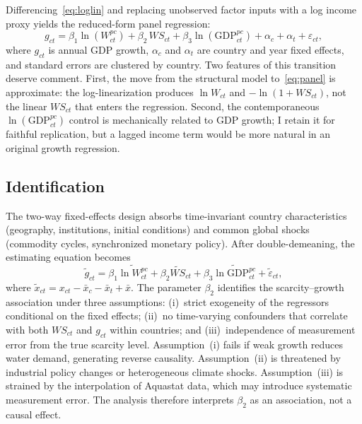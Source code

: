 \documentclass[12pt]{article}
\begin{document}
Differencing~\eqref{eq:loglin} and replacing unobserved factor inputs with a log income proxy yields the reduced-form panel regression:
\begin{equation}
g_{ct} = \beta_1 \ln(W^{pc}_{ct}) + \beta_2 \, WS_{ct} + \beta_3 \ln(\text{GDP}^{pc}_{ct}) + \alpha_c + \alpha_t + \varepsilon_{ct},
\label{eq:panel}
\end{equation}
where $g_{ct}$ is annual GDP growth, $\alpha_c$ and $\alpha_t$ are country and year fixed effects, and standard errors are clustered by country. Two features of this transition deserve comment. First, the move from the structural model to~\eqref{eq:panel} is approximate: the log-linearization produces $\ln W_{ct}$ and $-\ln(1+WS_{ct})$, not the linear $WS_{ct}$ that enters the regression. Second, the contemporaneous $\ln(\text{GDP}^{pc}_{ct})$ control is mechanically related to GDP growth; I retain it for faithful replication, but a lagged income term would be more natural in an original growth regression.

\subsection*{Identification}

The two-way fixed-effects design absorbs time-invariant country characteristics (geography, institutions, initial conditions) and common global shocks (commodity cycles, synchronized monetary policy). After double-demeaning, the estimating equation becomes
\begin{equation}
\tilde{g}_{ct} = \beta_1 \widetilde{\ln W^{pc}_{ct}} + \beta_2 \widetilde{WS}_{ct} + \beta_3 \widetilde{\ln \text{GDP}^{pc}_{ct}} + \tilde{\varepsilon}_{ct},
\label{eq:within}
\end{equation}
where $\tilde{x}_{ct} = x_{ct} - \bar{x}_c - \bar{x}_t + \bar{x}$. The parameter $\beta_2$ identifies the scarcity--growth association under three assumptions: (i)~strict exogeneity of the regressors conditional on the fixed effects; (ii)~no time-varying confounders that correlate with both $WS_{ct}$ and $g_{ct}$ within countries; and (iii)~independence of measurement error from the true scarcity level. Assumption~(i) fails if weak growth reduces water demand, generating reverse causality. Assumption~(ii) is threatened by industrial policy changes or heterogeneous climate shocks. Assumption~(iii) is strained by the interpolation of Aquastat data, which may introduce systematic measurement error. The analysis therefore interprets $\beta_2$ as an association, not a causal effect.
\end{document}
